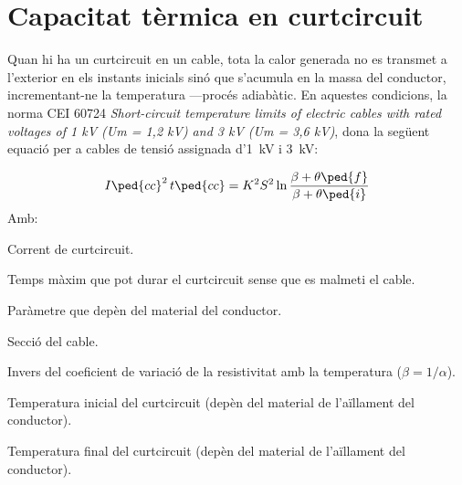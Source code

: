 \section{Capacitat tèrmica en curtcircuit}\label{ces:cables_Icc_termica}

Quan hi ha un curtcircuit en un cable, tota la calor generada no es transmet a l'exterior en els instants inicials sinó que s'acumula en la massa del conductor, incrementant-ne la temperatura ---procés adiabàtic. En aquestes condicions, la norma CEI 60724 \textit{Short-circuit temperature limits of electric cables with rated voltages of 1 kV (Um = 1,2 kV) and 3 kV (Um = 3,6 kV)}, dona la següent equació per a cables de tensió assignada d'\qty{1}{kV} i \qty{3}{kV}:

\begin{equation}
   I\ped{cc}^2 \,t\ped{cc} = K^2 S^2 \ln \frac{\beta + \theta\ped{f}}{\beta + \theta\ped{i}}
\end{equation}
Amb:

\begin{list}{}
   {\setlength{\labelwidth}{10mm} \setlength{\leftmargin}{12mm} \setlength{\labelsep}{2mm}}
   \item[\hspace{5mm}$I\ped{cc}$\hfill] Corrent de curtcircuit.
   \item[\hspace{5mm}$t\ped{cc}$\hfill] Temps màxim que pot durar el curtcircuit sense que es malmeti el cable.
   \item[\hspace{5mm}$K$\hfill] Paràmetre que depèn del material del conductor.
   \item[\hspace{5mm}$S$\hfill] Secció del cable.
   \item[\hspace{5mm}$\beta$\hfill] Invers del coeficient de variació de la resistivitat amb la temperatura ($\beta = 1/ \alpha$).
   \item[\hspace{5mm}$\theta\ped{i}$\hfill] Temperatura inicial del curtcircuit (depèn del material de l'aïllament del conductor).
   \item[\hspace{5mm}$\theta\ped{f}$\hfill] Temperatura final del curtcircuit (depèn del material de l'aïllament del conductor).
\end{list}

